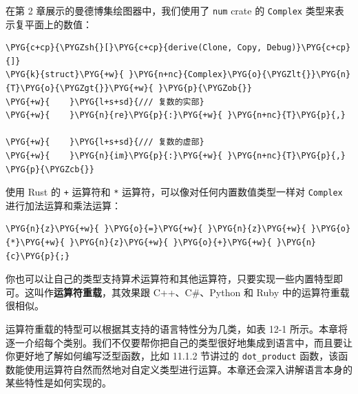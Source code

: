 
在第 2 章展示的曼德博集绘图器中，我们使用了 \texttt{num} crate 的 \texttt{Complex} 类型来表示复平面上的数值：

\begin{Verbatim}[commandchars=\\\{\},breaklines=true,breakanywhere=true,fontsize=\codefont,xleftmargin=17bp]
\PYG{c+cp}{\PYGZsh{}[}\PYG{c+cp}{derive(Clone, Copy, Debug)}\PYG{c+cp}{]}
\PYG{k}{struct}\PYG{+w}{ }\PYG{n+nc}{Complex}\PYG{o}{\PYGZlt{}}\PYG{n}{T}\PYG{o}{\PYGZgt{}}\PYG{+w}{ }\PYG{p}{\PYGZob{}}
\PYG{+w}{    }\PYG{l+s+sd}{/// 复数的实部}
\PYG{+w}{    }\PYG{n}{re}\PYG{p}{:}\PYG{+w}{ }\PYG{n+nc}{T}\PYG{p}{,}

\PYG{+w}{    }\PYG{l+s+sd}{/// 复数的虚部}
\PYG{+w}{    }\PYG{n}{im}\PYG{p}{:}\PYG{+w}{ }\PYG{n+nc}{T}\PYG{p}{,}
\PYG{p}{\PYGZcb{}}
\end{Verbatim}

使用 Rust 的 \texttt{+} 运算符和 \texttt{*} 运算符，可以像对任何内置数值类型一样对 \texttt{Complex} 进行加法运算和乘法运算：

\begin{Verbatim}[commandchars=\\\{\},breaklines=true,breakanywhere=true,fontsize=\codefont,xleftmargin=17bp]
\PYG{n}{z}\PYG{+w}{ }\PYG{o}{=}\PYG{+w}{ }\PYG{n}{z}\PYG{+w}{ }\PYG{o}{*}\PYG{+w}{ }\PYG{n}{z}\PYG{+w}{ }\PYG{o}{+}\PYG{+w}{ }\PYG{n}{c}\PYG{p}{;}
\end{Verbatim}

你也可以让自己的类型支持算术运算符和其他运算符，只要实现一些内置特型即可。这叫作\textbf{运算符重载}，其效果跟 C++、C\#、Python 和 Ruby 中的运算符重载很相似。

运算符重载的特型可以根据其支持的语言特性分为几类，如表 12-1 所示。本章将逐一介绍每个类别。我们不仅要帮你把自己的类型很好地集成到语言中，而且要让你更好地了解如何编写泛型函数，比如 11.1.2 节讲过的 \texttt{dot\_product} 函数，该函数能使用运算符自然而然地对自定义类型进行运算。本章还会深入讲解语言本身的某些特性是如何实现的。


